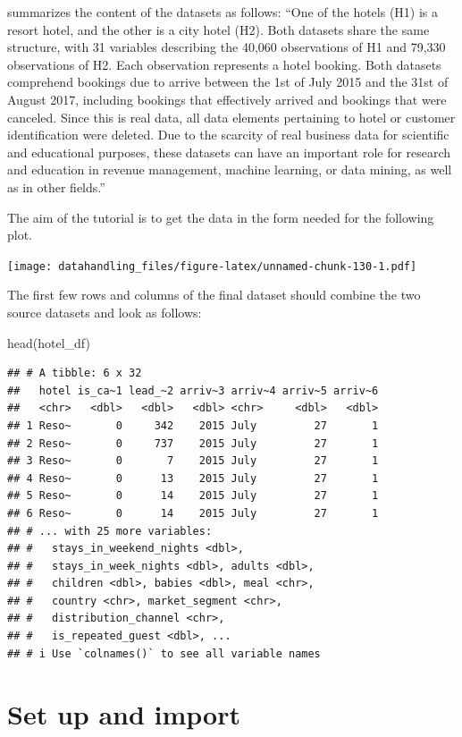 \documentclass[
  12pt,
]{style/krantz}
\newenvironment{Shaded}{\begin{snugshade}}{\end{snugshade}}
\newcommand{\FunctionTok}[1]{\textcolor[rgb]{0.00,0.00,0.00}{#1}}
\newcommand{\NormalTok}[1]{#1}
\begin{document}
\citet{nuno_etal2019} summarizes the content of the datasets as follows: ``One of the hotels (H1) is a resort hotel, and the other is a city hotel (H2). Both datasets share the same structure, with 31 variables describing the 40,060 observations of H1 and 79,330 observations of H2. Each observation represents a hotel booking. Both datasets comprehend bookings due to arrive between the 1st of July 2015 and the 31st of August 2017, including bookings that effectively arrived and bookings that were canceled. Since this is real data, all data elements pertaining to hotel or customer identification were deleted. Due to the scarcity of real business data for scientific and educational purposes, these datasets can have an important role for research and education in revenue management, machine learning, or data mining, as well as in other fields.''

The aim of the tutorial is to get the data in the form needed for the following plot.

\texttt{[image: datahandling\_files/figure-latex/unnamed-chunk-130-1.pdf]}

The first few rows and columns of the final dataset should combine the two source datasets and look as follows:

\begin{Shaded}
\begin{Highlighting}[]
\FunctionTok{head}\NormalTok{(hotel\_df)}
\end{Highlighting}
\end{Shaded}

\begin{verbatim}
## # A tibble: 6 x 32
##   hotel is_ca~1 lead_~2 arriv~3 arriv~4 arriv~5 arriv~6
##   <chr>   <dbl>   <dbl>   <dbl> <chr>     <dbl>   <dbl>
## 1 Reso~       0     342    2015 July         27       1
## 2 Reso~       0     737    2015 July         27       1
## 3 Reso~       0       7    2015 July         27       1
## 4 Reso~       0      13    2015 July         27       1
## 5 Reso~       0      14    2015 July         27       1
## 6 Reso~       0      14    2015 July         27       1
## # ... with 25 more variables:
## #   stays_in_weekend_nights <dbl>,
## #   stays_in_week_nights <dbl>, adults <dbl>,
## #   children <dbl>, babies <dbl>, meal <chr>,
## #   country <chr>, market_segment <chr>,
## #   distribution_channel <chr>,
## #   is_repeated_guest <dbl>, ...
## # i Use `colnames()` to see all variable names
\end{verbatim}

\hypertarget{set-up-and-import}{%
\section{Set up and import}\label{set-up-and-import}}
\end{document}
